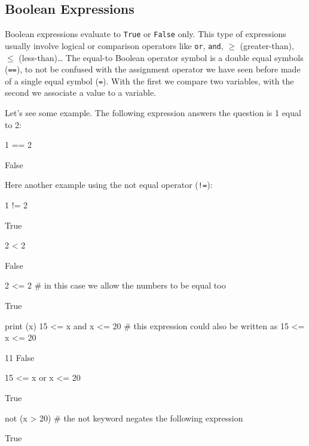 \subsection{Boolean Expressions}\label{boolean-expressions}

Boolean expressions evaluate to \texttt{True} or \texttt{False} only. This type
of expressions usually involve logical or comparison operators like \texttt{or}, \texttt{and}, $\geq$ (greater-than), $\leq$ (less-than)\ldots
The equal-to Boolean operator symbol is a double equal symbols (\texttt{==}), to not be confused with the assignment operator we have seen before made of a single equal symbol (\texttt{=}). With the first we compare two variables, with the second we associate a value to a variable.

Let's see some example. The following expression answers the question is 1 equal to 2:

\begin{ipython}
1 == 2
\end{ipython}
\begin{ioutput}
False
\end{ioutput}

Here another example using the not equal operator (\texttt{!=}):

\begin{ipython}
1 != 2
\end{ipython}
\begin{ioutput}
True
\end{ioutput}
\begin{ipython}
2 < 2
\end{ipython}
\begin{ioutput}
False
\end{ioutput}
\begin{ipython}
2 <= 2 # in this case we allow the numbers to be equal too 
\end{ipython}
\begin{ioutput}
True
\end{ioutput}
\begin{ipython}
print (x)
15 <= x and x <= 20 # this expression could also be written as 15 <= x <= 20
\end{ipython}
\begin{ioutput}
11
False
\end{ioutput}
\begin{ipython}
15 <= x or x <= 20 
\end{ipython}
\begin{ioutput}
True
\end{ioutput}
\begin{ipython}
not (x > 20) # the not keyword negates the following expression 
\end{ipython}
\begin{ioutput}
True
\end{ioutput}

